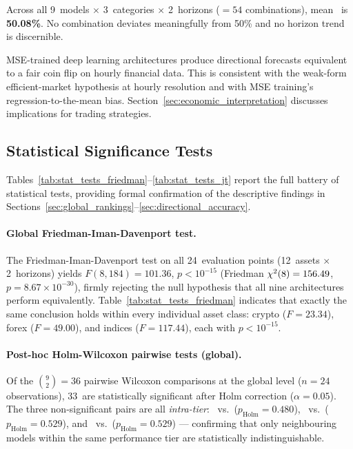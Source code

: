 

Across all 9~models $\times$ 3~categories $\times$ 2~horizons ($=54$ combinations), mean \da\ is \textbf{50.08\%}.  No combination deviates meaningfully from 50\% and no horizon trend is discernible.

MSE-trained deep learning architectures produce directional forecasts equivalent to a fair coin flip on hourly financial data.  This is consistent with the weak-form efficient-market hypothesis at hourly resolution and with MSE training's regression-to-the-mean bias.  Section~\ref{sec:economic_interpretation} discusses implications for trading strategies.


\subsection{Statistical Significance Tests}
\label{sec:statistical_tests}

Tables~\ref{tab:stat_tests_friedman}--\ref{tab:stat_tests_jt} report the full battery of statistical tests, providing formal confirmation of the descriptive findings in Sections~\ref{sec:global_rankings}--\ref{sec:directional_accuracy}.



\paragraph{Global Friedman-Iman-Davenport test.}
The Friedman-Iman-Davenport test on all 24~evaluation points (12~assets $\times$ 2~horizons) yields $F(8,184) = 101.36$, $p < 10^{-15}$ (Friedman $\chi^2(8) = 156.49$, $p = 8.67 \times 10^{-30}$), firmly rejecting the null hypothesis that all nine architectures perform equivalently.  Table~\ref{tab:stat_tests_friedman} indicates that exactly the same conclusion holds within every individual asset class: crypto ($F = 23.34$), forex ($F = 49.00$), and indices ($F = 117.44$), each with $p < 10^{-15}$.

\paragraph{Post-hoc Holm-Wilcoxon pairwise tests (global).}
Of the $\binom{9}{2} = 36$ pairwise Wilcoxon comparisons at the global level ($n = 24$ observations), 33~are statistically significant after Holm correction ($\alpha = 0.05$).  The three non-significant pairs are all \emph{intra-tier}: \timexer~vs.~\itransformer ($p_\text{Holm} = 0.480$), \autoformer~vs.~\timesnet ($p_\text{Holm} = 0.529$), and \dlinear~vs.~\nhits ($p_\text{Holm} = 0.529$) --- confirming that only neighbouring models within the same performance tier are statistically indistinguishable.

